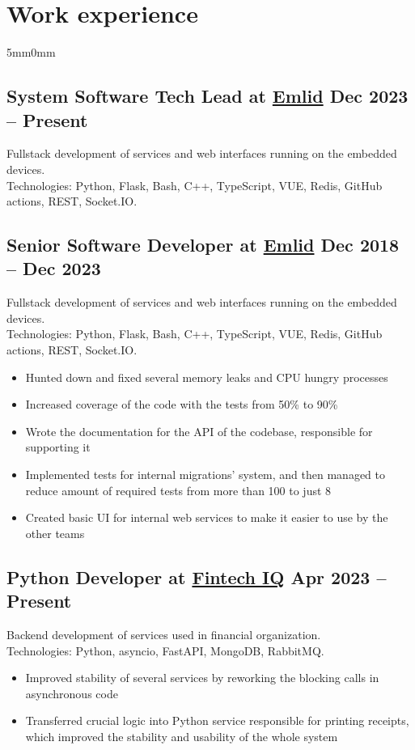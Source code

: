 \documentclass[10pt]{article}
\newcommand{\lmvalue}{5mm}
\newcommand{\rmvalue}{0mm}
\begin{document}
\section*{Work experience}
\begin{changemargin}{\lmvalue}{\rmvalue}
	\subsection*{System Software Tech Lead at \href{https://emlid.com}{Emlid}
		\hfill {\color{gray}Dec 2023 – Present}}
	Fullstack development of services and web interfaces running on the embedded devices.\\
	Technologies: Python, Flask, Bash, C++, TypeScript, VUE, Redis, GitHub actions, REST, Socket.IO\@.
	\subsection*{Senior Software Developer at \href{https://emlid.com}{Emlid}
		\hfill {\color{gray}Dec 2018 – Dec 2023}}
	Fullstack development of services and web interfaces running on the embedded devices.\\
	Technologies: Python, Flask, Bash, C++, TypeScript, VUE, Redis, GitHub actions, REST, Socket.IO\@.
	\begin{itemize}
		\item Hunted down and fixed several memory leaks and CPU hungry processes
		\item Increased coverage of the code with the tests from 50\% to 90\%
		\item Wrote the documentation for the API of the codebase, responsible for supporting it
		\item Implemented tests for internal migrations' system, and then managed to reduce amount of required tests from more than 100 to just 8
		\item Created basic UI for internal web services to make it easier to use by the other teams
	\end{itemize}

	\subsection*{Python Developer at \href{https://www.linkedin.com/company/fintech-iq/}{Fintech IQ}
		\hfill {\color{gray}Apr 2023 – Present}}

	Backend development of services used in financial organization.\\
	Technologies: Python, asyncio, FastAPI, MongoDB, RabbitMQ.\@
	\begin{itemize}
		\item Improved stability of several services by reworking the blocking calls in asynchronous code
		\item Transferred crucial logic into Python service responsible for printing receipts, which improved the stability and usability of the whole system
	\end{itemize}


\end{changemargin}
\end{document}
